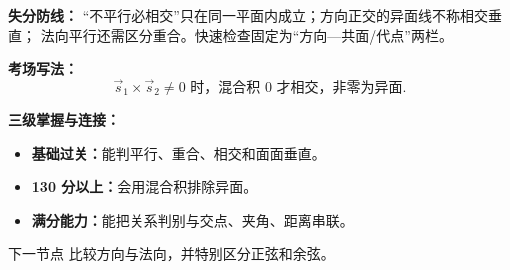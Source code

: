 \begin{knowledgeBox}
\textbf{失分防线：}
“不平行必相交”只在同一平面内成立；方向正交的异面线不称相交垂直；
法向平行还需区分重合。快速检查固定为“方向—共面/代点”两栏。

\textbf{考场写法：}
\[
\boxed{\vec s_1\times\vec s_2\ne0\text{ 时，混合积 }0
\text{ 才相交，非零为异面}.}
\]

\textbf{三级掌握与连接：}
\begin{itemize}
  \item \textbf{基础过关：}能判平行、重合、相交和面面垂直。
  \item \textbf{130 分以上：}会用混合积排除异面。
  \item \textbf{满分能力：}能把关系判别与交点、夹角、距离串联。
\end{itemize}
下一节点 
比较方向与法向，并特别区分正弦和余弦。
\end{knowledgeBox}



